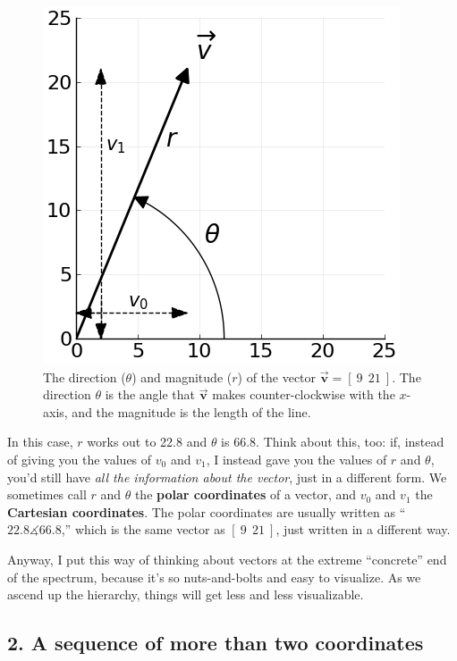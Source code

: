\begin{figure}[ht]
\centering
\includegraphics[width=.7\textwidth]{directionMag.png}
\caption[.]{The direction ($\theta$) and magnitude ($r$) of the vector
$\overrightarrow{\textbf{v}} = [\ 9 \ \ 21\ ]$. The direction $\theta$ is the
angle that $\overrightarrow{\textbf{v}}$ makes counter-clockwise with the
$x$-axis, and the magnitude is the length of the line.}
\label{fig:directionMag}
\end{figure}
\smallskip


In this case, $r$ works out to 22.8 and $\theta$ is 66.8\textdegree. Think
about this, too: if, instead of giving you the values of $v_0$ and $v_1$, I
instead gave you the values of $r$ and $\theta$, you'd still have \textit{all
the information about the vector}, just in a different form. We sometimes call
$r$ and $\theta$ the \textbf{polar coordinates} of a vector, and $v_0$ and
$v_1$ the \textbf{Cartesian coordinates}. The polar coordinates are usually
written as ``$22.8 \measuredangle 66.8$\textdegree,'' which is the same vector
as $[\ 9 \ \ 21 \ ]$, just written in a different way.

Anyway, I put this way of thinking about vectors at the extreme ``concrete''
end of the spectrum, because it's so nuts-and-bolts and easy to visualize. As
we ascend up the hierarchy, things will get less and less visualizable.


\subsection{2. A sequence of more than two coordinates}


